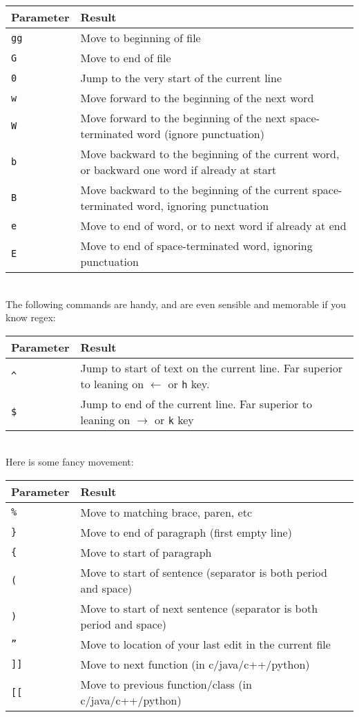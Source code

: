 \documentclass[a4paper, 12pt]{article}
\begin{document}
\begin{tabular}{ l | p{9cm}}
  {\bf Parameter} & {\bf Result} \\ \hline
  \texttt{gg} &	Move to beginning of file\\
  \texttt{G} & Move to end of file\\
  \texttt{0} & Jump to the very start of the current line\\
  \texttt{w} & Move forward to the beginning of the next word \\
  \texttt{W} & Move forward to the beginning of the next space-terminated word (ignore punctuation)\\
  \texttt{b} & Move backward to the beginning of the current word, or backward one word if already at start\\
  \texttt{B} & Move backward to the beginning of the current space-terminated word, ignoring punctuation\\
  \texttt{e} & Move to end of word, or to next word if already at end\\
  \texttt{E} & Move to end of space-terminated word, ignoring punctuation\\ \hline
\end{tabular}\\

\noindent
The following commands are handy, and are even sensible and memorable if you know regex:

\begin{tabular}{ l | p{9cm}}
  {\bf Parameter} & {\bf Result} \\ \hline
  \texttt{\^{}} & Jump to start of text on the current line. Far superior to leaning on $\leftarrow$ or \texttt{h} key.\\
  \texttt{\$} &	Jump to end of the current line. Far superior to leaning on $\rightarrow$ or \texttt{k} key\\ \hline
\end{tabular}\\

\noindent
Here is some fancy movement:

\begin{tabular}{ l | p{9cm}}
  {\bf Parameter} & {\bf Result} \\ \hline
  \texttt{\%} & Move to matching brace, paren, etc\\
  \texttt{\}} & Move to end of paragraph (first empty line)\\
  \texttt{\{} &	Move to start of paragraph\\
  \texttt{(} & Move to start of sentence (separator is both period and space)\\
  \texttt{)} & Move to start of next sentence (separator is both period and space)\\
  \texttt{''} &	Move to location of your last edit in the current file\\
  \texttt{]]} &	Move to next function (in c/java/c++/python)\\
  \texttt{[[} &	Move to previous function/class (in c/java/c++/python)\\ \hline
\end{tabular}\\
\end{document}
